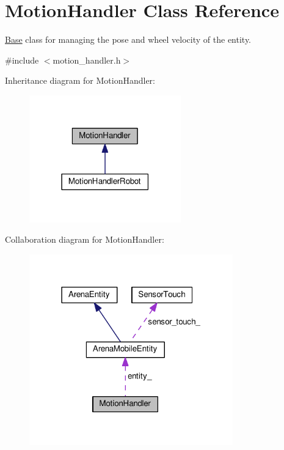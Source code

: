 \hypertarget{classMotionHandler}{}\section{Motion\+Handler Class Reference}
\label{classMotionHandler}


\hyperlink{classBase}{Base} class for managing the pose and wheel velocity of the entity.  




{\ttfamily \#include $<$motion\+\_\+handler.\+h$>$}



Inheritance diagram for Motion\+Handler\+:\nopagebreak
\begin{figure}[H]
\begin{center}
\leavevmode
\includegraphics[width=186pt]{classMotionHandler__inherit__graph}
\end{center}
\end{figure}


Collaboration diagram for Motion\+Handler\+:\nopagebreak
\begin{figure}[H]
\begin{center}
\leavevmode
\includegraphics[width=250pt]{classMotionHandler__coll__graph}
\end{center}
\end{figure}

